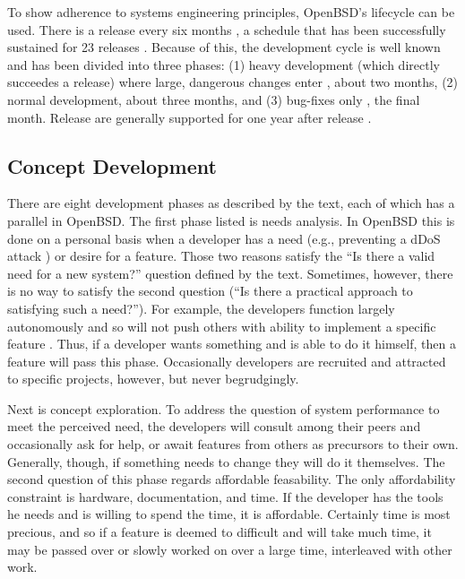 \documentclass[12pt]{article}
\begin{document}
{To show adherence to systems engineering principles, OpenBSD's lifecycle can be used. There is a release every six months \cite{release}, a schedule that has been successfully sustained for 23 releases \cite{release-success}. Because of this, the development cycle is well known and has been divided into three phases: (1) heavy development (which directly succeedes a release) where large, dangerous changes enter \cite{fast}, about two months, (2) normal development, about three months, and (3) bug-fixes only \cite{softlock}, the final month. Release are generally supported for one year after release \cite{lifecycle}.

\subsection*{Concept Development}

There are eight development phases as described by the text, each of which has a parallel in OpenBSD. The first phase listed is needs analysis. In OpenBSD this is done on a personal basis when a developer has a need (e.g., preventing a dDoS attack \cite{whatidid}) or desire \cite{itch} for a feature. Those two reasons satisfy the ``Is there a valid need for a new system?'' question defined by the text. Sometimes, however, there is no way to satisfy the second question (``Is there a practical approach to satisfying such a need?''). For example, the developers function largely autonomously \cite{itch} and so will not push others with ability to implement a specific feature \cite{rthreads}. Thus, if a developer wants something and is able to do it himself, then a feature will pass this phase. Occasionally developers are recruited and attracted to specific projects, however, but never begrudgingly.

Next is concept exploration. To address the question of system performance to meet the perceived need, the developers will consult among their peers and occasionally ask for help, or await features from others as precursors to their own. Generally, though, if something needs to change they will do it themselves. The second question of this phase regards affordable feasability. The only affordability constraint is hardware, documentation, and time. If the developer has the tools he needs and is willing to spend the time, it is affordable. Certainly time is most precious, and so if a feature is deemed to difficult and will take much time, it may be passed over or slowly worked on over a large time, interleaved with other work.

}
\end{document}

